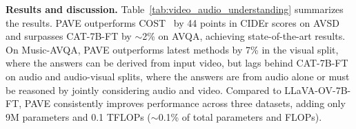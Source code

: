 \medskip
\noindent\textbf{Results and discussion.}
Table~\ref{tab:video_audio_understanding} summarizes the results. PAVE outperforms COST~\cite{pham2022videodialogconversationobjects} by 44 points in CIDEr scores on AVSD and surpasses CAT-7B-FT by $\sim$2\% on AVQA, achieving state-of-the-art results. 
On Music-AVQA, PAVE outperforms latest methods by 7\% in the visual split, where the answers can be derived from input video, but lags behind CAT-7B-FT on audio and audio-visual splits, where the answers are from audio alone or must be reasoned by jointly considering audio and video. Compared to LLaVA-OV-7B-FT, PAVE consistently improves performance across three datasets, adding only 9M parameters and 0.1 TFLOPs ($\sim$0.1\% of total parameters and FLOPs). 

